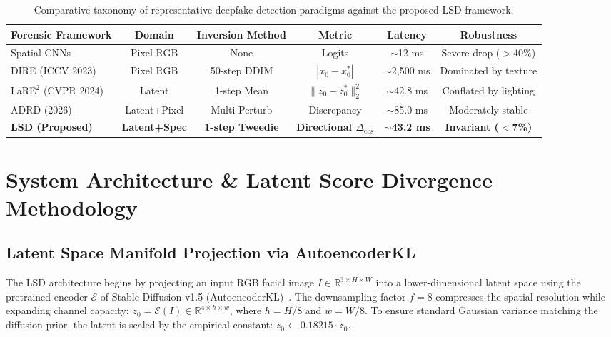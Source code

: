 \documentclass[12pt,a4paper]{report}
\begin{document}
\begin{table}[h]
\centering
\small
\caption{Comparative taxonomy of representative deepfake detection paradigms against the proposed LSD framework.}
\label{tab:taxonomy}
\begin{tabularx}{\textwidth}{lccccc}
\toprule
\textbf{Forensic Framework} & \textbf{Domain} & \textbf{Inversion Method} & \textbf{Metric} & \textbf{Latency} & \textbf{Robustness} \\
\midrule
Spatial CNNs~\cite{rossler2019faceforensics} & Pixel RGB & None & Logits & $\sim$12 ms & Severe drop ($>$40\%) \\
DIRE (ICCV 2023)~\cite{wang2023dire} & Pixel RGB & 50-step DDIM & $|x_0 - x^*_0|$ & $\sim$2,500 ms & Dominated by texture \\
LaRE$^2$ (CVPR 2024)~\cite{chen2024lare} & Latent & 1-step Mean & $\|z_0 - z^*_0\|_2^2$ & $\sim$42.8 ms & Conflated by lighting \\
ADRD (2026)~\cite{liu2026adrd} & Latent+Pixel & Multi-Perturb & Discrepancy & $\sim$85.0 ms & Moderately stable \\
\textbf{LSD (Proposed)} & \textbf{Latent+Spec} & \textbf{1-step Tweedie} & \textbf{Directional $\Delta_{\cos}$} & \textbf{$\sim$43.2 ms} & \textbf{Invariant ($<$7\%)} \\
\bottomrule
\end{tabularx}
\end{table}

\clearpage

\chapter{System Architecture \& Latent Score Divergence Methodology}

\section{Latent Space Manifold Projection via AutoencoderKL}
The LSD architecture begins by projecting an input RGB facial image $I \in \mathbb{R}^{3 \times H \times W}$ into a lower-dimensional latent space using the pretrained encoder $\mathcal{E}$ of Stable Diffusion v1.5 (AutoencoderKL)~\cite{rombach2022high}. The downsampling factor $f = 8$ compresses the spatial resolution while expanding channel capacity: $z_0 = \mathcal{E}(I) \in \mathbb{R}^{4 \times h \times w}$, where $h = H/8$ and $w = W/8$. To ensure standard Gaussian variance matching the diffusion prior, the latent is scaled by the empirical constant: $z_0 \leftarrow 0.18215 \cdot z_0$.
\end{document}
